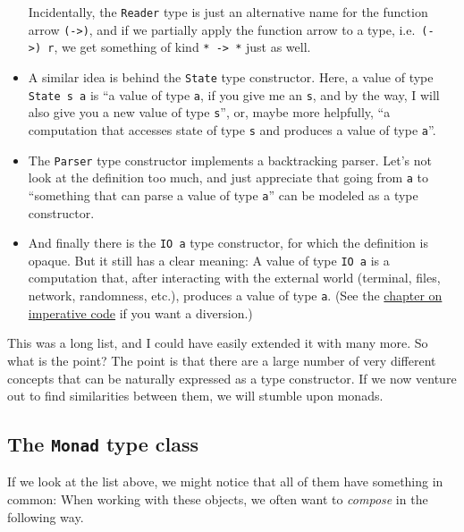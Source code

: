 \documentclass[11pt,
  american,
  DIV13]{article}
\begin{document}
\begin{itemize}
  Incidentally, the \texttt{Reader} type is just an alternative name for
  the function arrow \texttt{(-\textgreater{})}, and if we partially
  apply the function arrow to a type,
  i.e.~\texttt{(-\textgreater{})\ r}, we get something of kind
  \texttt{*\ -\textgreater{}\ *} just as well.
\item
  A similar idea is behind the \texttt{State} type constructor. Here, a
  value of type \texttt{State\ s\ a} is ``a value of type \texttt{a}, if
  you give me an \texttt{s}, and by the way, I will also give you a new
  value of type \texttt{s}'', or, maybe more helpfully, ``a computation
  that accesses state of type \texttt{s} and produces a value of type
  \texttt{a}''.
\item
  The \texttt{Parser} type constructor implements a backtracking parser.
  Let's not look at the definition too much, and just appreciate that
  going from \texttt{a} to ``something that can parse a value of type
  \texttt{a}'' can be modeled as a type constructor.
\item
  And finally there is the \texttt{IO\ a} type constructor, for which
  the definition is opaque. But it still has a clear meaning: A value of
  type \texttt{IO\ a} is a computation that, after interacting with the
  external world (terminal, files, network, randomness, etc.), produces
  a value of type \texttt{a}. (See the \protect\hyperlink{io}{chapter on
  imperative code} if you want a diversion.)
\end{itemize}

This was a long list, and I could have easily extended it with many
more. So what is the point? The point is that there are a large number
of very different concepts that can be naturally expressed as a type
constructor. If we now venture out to find similarities between them, we
will stumble upon monads.

\hypertarget{the-monad-type-class}{%
\subsection{\texorpdfstring{The \texttt{Monad} type
class}{The Monad type class}}\label{the-monad-type-class}}

If we look at the list above, we might notice that all of them have
something in common: When working with these objects, we often want to
\emph{compose} in the following way.
\end{document}
